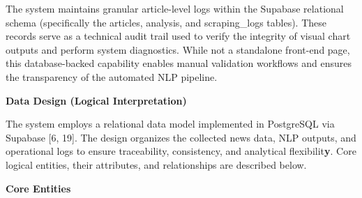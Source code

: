 The system maintains granular article-level logs within the Supabase relational schema (specifically the articles, analysis, and scraping\_logs tables). These records serve as a technical audit trail used to verify the integrity of visual chart outputs and perform system diagnostics. While not a standalone front-end page, this database-backed capability enables manual validation workflows and ensures the transparency of the automated NLP pipeline.

\textbf{Data Design (Logical Interpretation)}

The system employs a relational data model implemented in PostgreSQL via Supabase {[}6, 19{]}. The design organizes the collected news data, NLP outputs, and operational logs to ensure traceability, consistency, and analytical flexibilit\textbf{y}. Core logical entities, their attributes, and relationships are described below.

\textbf{Core Entities}


